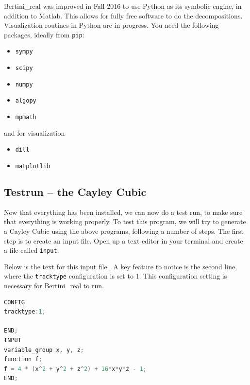 Bertini\_real was improved in Fall 2016 to use Python as its symbolic engine, in addition to Matlab.  This allows for fully free software to do the decompositions.  Visualization routines in Python are in progress.  You need the following packages, ideally from {\tt pip}:
\begin{itemize}
\item {\tt sympy}
\item {\tt scipy}
\item {\tt numpy}
\item {\tt algopy}
\item {\tt mpmath}
  \end{itemize}
and for visualization
\begin{itemize}
\item {\tt dill}
\item {\tt matplotlib}
  \end{itemize}
























\clearpage

\subsection{Testrun -- the Cayley Cubic}

Now that everything has been installed, we can now do a test run, to make sure that everything is working properly. To test this program, we will try to generate a Cayley Cubic using the above programs, following a number of steps. The first step is to create an input file. Open up a text editor in your terminal and create a file called \texttt{input}. 

Below is the text for this input file.. A key feature to notice is the second line, where the \texttt{tracktype} configuration is set to 1. This configuration setting is necessary for Bertini\_real to run. 

\begin{center}\begin{minipage}{0.9\linewidth}
\begin{lstlisting}[language=c++, caption={\tt input} for the Cayley Cubic, captionpos=b]
CONFIG 
tracktype:1;

END;
INPUT
variable_group x, y, z;
function f;
f = 4 * (x^2 + y^2 + z^2) + 16*x*y*z - 1;
END;
\end{lstlisting}
\end{minipage}\end{center}

